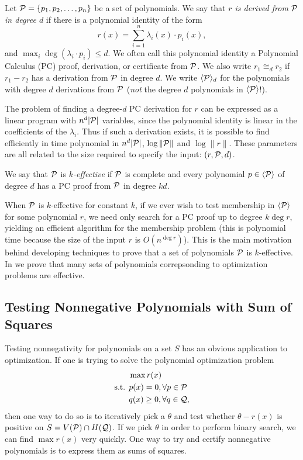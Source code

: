 \begin{definition}
Let $\mathcal P = \{p_1, p_2, \dots, p_n\}$ be a set of polynomials. We say that \emph{$r$ is derived from $\mathcal P$ in degree $d$} if there is a polynomial identity of the form
\[r(x) = \sum_{i=1}^n \lambda_i(x) \cdot p_i(x),\]
and $\max_i \deg(\lambda_i \cdot p_i) \leq d$. We often call this polynomial identity a Polynomial Calculus (PC) proof, derivation, or certificate from $\mathcal P$. We also write $r_1 \cong_d r_2$ if $r_1 - r_2$ has a derivation from $\mathcal P$ in degree $d$. We write $\langle \mathcal P \rangle_d$ for the polynomials with degree $d$ derivations from $\mathcal P$ (\emph{not} the degree $d$ polynomials in $\langle \mathcal P \rangle$!).
\end{definition} 

The problem of finding a degree-$d$ PC derivation for $r$ can be expressed as a linear program with $n^d|\mathcal P|$ variables, since the polynomial identity is linear in the coefficients of the $\lambda_i$. Thus if such a derivation exists, it is possible to find efficiently in time polynomial in $n^d|\mathcal P|$, $\log \|\mathcal P\|$ and $\log \|r\|$. These parameters are all related to the size required to specify the input: $(r,\mathcal P,d)$.
\begin{definition}
We say that $\mathcal P$ is \emph{$k$-effective} if $\mathcal P$ is complete and every polynomial $p \in \langle \mathcal P \rangle$ of degree $d$ has a PC proof from $\mathcal P$ in degree $kd$.
\end{definition}
When $\mathcal P$ is $k$-effective for constant $k$, if we ever wish to test membership in $\langle \mathcal P \rangle$ for some polynomial $r$, we need only search for a PC proof up to degree $k \deg r$, yielding an efficient algorithm for the membership problem (this is polynomial time because the size of the input $r$ is $O(n^{\deg r})$). This is the main motivation behind developing techniques to prove that a set of polynomials $\mathcal P$ is $k$-effective. In  we prove that many sets of polynomials correpsonding to optimization problems are effective. 

\subsection{Testing Nonnegative Polynomials with Sum of Squares}

Testing nonnegativity for polynomials on a set $S$ has an obvious application to optimization. If one is trying to solve the polynomial optimization problem
\begin{align*}
&\max r(x) \\
\text{s.t. } &p(x) = 0, \forall p \in \mathcal P \\
&q(x) \geq 0, \forall q \in \mathcal Q,
\end{align*}
then one way to do so is to iteratively pick a $\theta$ and test whether $\theta - r(x)$ is positive on $S = V(\mathcal P) \cap H(\mathcal Q)$. 
If we pick $\theta$ in order to perform binary search, we can find $\max r(x)$ very quickly. One way to try and certify nonnegative polynomials is to express them as sums of squares.

